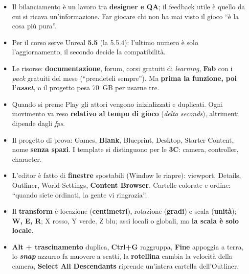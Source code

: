 \begin{itemize}
        volte \textbf{tempo}); il divertimento è una \textbf{conseguenza}, e il gameplay
        nasce dalle \textbf{scelte}. Meccanica = che cosa posso fare; dinamica = come lo
        faccio; estetica = come mi fa sentire. ``Un gioco per tutti non è un gioco per
        nessuno.''
  \item Il bilanciamento è un lavoro tra \textbf{designer e QA}; il feedback utile è
        quello da cui si ricava un'informazione. Far giocare chi non ha mai visto il
        gioco ``è la cosa più pura''.
  \item Per il corso serve Unreal \textbf{5.5} (la 5.5.4): l'ultimo numero è solo
        l'aggiornamento, il secondo decide la compatibilità.
  \item Le risorse: \textbf{documentazione}, forum, corsi gratuiti di
        \emph{learning}, \textbf{Fab} con i \emph{pack} gratuiti del mese (``prendeteli
        sempre''). Ma \textbf{prima la funzione, poi l'\emph{asset}}, o il progetto
        pesa 70~GB per usarne tre.
  \item Quando si preme Play gli attori vengono inizializzati e duplicati. Ogni
        movimento va reso \textbf{relativo al tempo di gioco} (\emph{delta seconds}),
        altrimenti dipende dagli \emph{fps}.
  \item Il progetto di prova: Games, \textbf{Blank}, Blueprint, Desktop, Starter
        Content, nome \textbf{senza spazi}. I template si distinguono per le
        \textbf{3C}: camera, controller, character.
  \item L'editor è fatto di \textbf{finestre} spostabili (Window le riapre): viewport,
        Details, Outliner, World Settings, \textbf{Content Browser}. Cartelle colorate
        e ordine: ``quando siete ordinati, la gente vi ringrazia''.
  \item Il \textbf{transform} è locazione (\textbf{centimetri}), rotazione
        (\textbf{gradi}) e scala (\textbf{unità}); \textbf{W, E, R}; X rosso, Y verde,
        Z blu; assi locali o globali, ma \textbf{la scala è solo locale}.
  \item \textbf{Alt + trascinamento} duplica, \textbf{Ctrl+G} raggruppa, \textbf{Fine}
        appoggia a terra, lo \textbf{\emph{snap}} azzurro fa muovere a scatti, la
        \textbf{rotellina} cambia la velocità della camera, \textbf{Select All
        Descendants} riprende un'intera cartella dell'Outliner.
\end{itemize}
